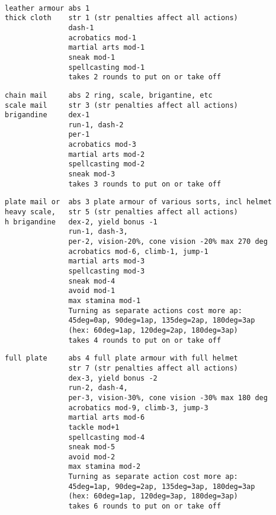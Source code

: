 \

\goodbreak \small \begin{samepage} \begin{verbatim}
leather armour abs 1
thick cloth    str 1 (str penalties affect all actions)
               dash-1
               acrobatics mod-1
               martial arts mod-1
               sneak mod-1
               spellcasting mod-1
               takes 2 rounds to put on or take off
\end{verbatim} \blocklistgap \begin{verbatim}
chain mail     abs 2 ring, scale, brigantine, etc
scale mail     str 3 (str penalties affect all actions)
brigandine     dex-1
               run-1, dash-2
               per-1
               acrobatics mod-3
               martial arts mod-2
               spellcasting mod-2
               sneak mod-3
               takes 3 rounds to put on or take off
\end{verbatim} \blocklistgap \begin{verbatim}
plate mail or  abs 3 plate armour of various sorts, incl helmet
heavy scale,   str 5 (str penalties affect all actions)
h brigandine   dex-2, yield bonus -1
               run-1, dash-3,
               per-2, vision-20%, cone vision -20% max 270 deg
               acrobatics mod-6, climb-1, jump-1
               martial arts mod-3
               spellcasting mod-3
               sneak mod-4
               avoid mod-1
               max stamina mod-1
               Turning as separate actions cost more ap:
               45deg=0ap, 90deg=1ap, 135deg=2ap, 180deg=3ap
               (hex: 60deg=1ap, 120deg=2ap, 180deg=3ap)
               takes 4 rounds to put on or take off
\end{verbatim} \blocklistgap \begin{verbatim}
full plate     abs 4 full plate armour with full helmet
               str 7 (str penalties affect all actions)
               dex-3, yield bonus -2
               run-2, dash-4,
               per-3, vision-30%, cone vision -30% max 180 deg
               acrobatics mod-9, climb-3, jump-3
               martial arts mod-6
               tackle mod+1
               spellcasting mod-4
               sneak mod-5
               avoid mod-2
               max stamina mod-2
               Turning as separate action cost more ap:
               45deg=1ap, 90deg=2ap, 135deg=3ap, 180deg=3ap
               (hex: 60deg=1ap, 120deg=3ap, 180deg=3ap)
               takes 6 rounds to put on or take off
\end{verbatim} \blocklistgap \begin{verbatim}

\end{verbatim}
\end{samepage}
